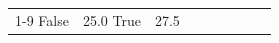 \begin{table}[H]
\begin{tabular}{lllrlllll}
\cline{1-9}
False & 25.0%
\cline{1-9}
True & 27.5%

\end{tabular}
\end{table}
